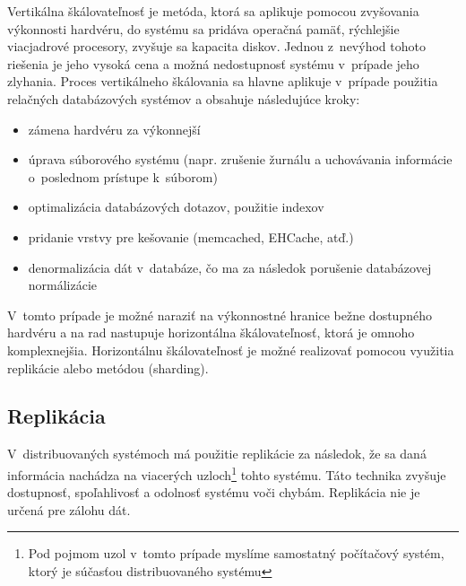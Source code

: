 \documentclass[11pt,twoside,a4paper]{book}
\begin{document}
Vertikálna škálovateľnosť je metóda, ktorá sa aplikuje pomocou zvyšovania výkonnosti hardvéru, do systému sa pridáva operačná pamäť, rýchlejšie viacjadrové procesory, zvyšuje sa kapacita diskov. Jednou z~nevýhod tohoto riešenia je jeho vysoká cena a možná nedostupnosť systému v~prípade jeho zlyhania.
Proces vertikálneho škálovania sa hlavne aplikuje v~prípade použitia relačných databázových systémov  a obsahuje následujúce kroky:
\begin{itemize}
 \item zámena hardvéru za výkonnejší
 \item úprava súborového systému (napr. zrušenie žurnálu a uchovávania informácie o~poslednom prístupe k~súborom)
 \item optimalizácia databázových dotazov, použitie indexov
 \item pridanie vrstvy pre kešovanie (memcached, EHCache, atď.)
 \item denormalizácia dát v~databáze, čo ma za následok porušenie databázovej normálizácie
\end{itemize}

V~tomto prípade je možné naraziť na výkonnostné hranice bežne dostupného hardvéru a na rad nastupuje horizontálna škálovateľnosť, ktorá je omnoho komplexnejšia. Horizontálnu škálovateľnosť je možné realizovať pomocou využitia replikácie alebo metódou  (sharding).

\subsection{Replikácia}

V~distribuovaných systémoch má použitie replikácie za následok, že sa daná informácia nachádza na viacerých uzloch\footnote{Pod pojmom uzol v~tomto prípade myslíme samostatný počítačový systém, ktorý je súčasťou distribuovaného systému} tohto systému. Táto technika zvyšuje dostupnosť, spoľahlivosť a odolnosť systému voči chybám. Replikácia nie je určená pre zálohu dát. 
\end{document}
